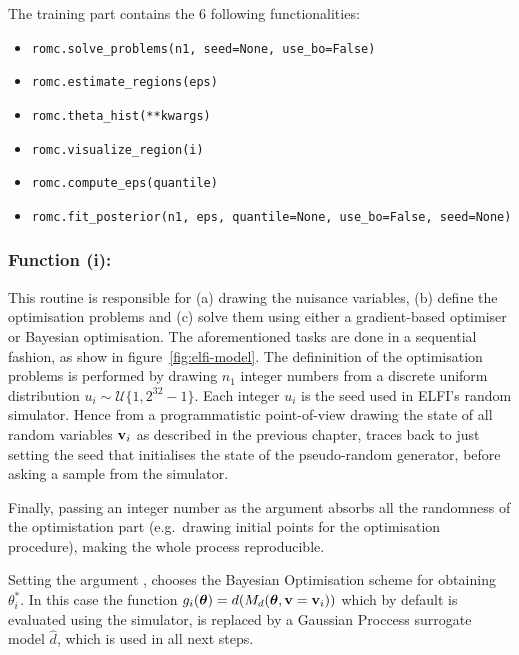 The training part contains the 6 following functionalities:

\begin{itemize}
\item \texttt{romc.solve_problems(n1, seed=None, use_bo=False)}
\item \texttt{romc.estimate_regions(eps)}
\item \texttt{romc.theta_hist(**kwargs)}
\item \texttt{romc.visualize_region(i)}
\item \texttt{romc.compute_eps(quantile)}
\item \texttt{romc.fit_posterior(n1, eps, quantile=None, use_bo=False, seed=None)}
\end{itemize}


\subsubsection*{Function (i): }

\noindent
This routine is responsible for (a) drawing the nuisance variables,
(b) define the optimisation problems and (c) solve them using either a
gradient-based optimiser or Bayesian optimisation. The aforementioned
tasks are done in a sequential fashion, as show in
figure~\ref{fig:elfi-model}. The defininition of the optimisation
problems is performed by drawing $n_1$ integer numbers from a discrete
uniform distribution $u_i \sim \mathcal{U}\{1, 2^{32}-1\}$. Each
integer $u_i$ is the seed used in ELFI's random simulator. Hence from
a programmatistic point-of-view drawing the state of all random
variables $\mathbf{v}_i$ as described in the previous chapter, traces back to
just setting the seed that initialises the state of the pseudo-random
generator, before asking a sample from the simulator.

Finally, passing an integer number as the argument 
absorbs all the randomness of the optimistation part (e.g.\ drawing
initial points for the optimisation procedure), making the whole
process reproducible.

Setting the argument , chooses the Bayesian
Optimisation scheme for obtaining $\theta_i^*$. In this case the
function $g_i(\boldsymbol{\theta}) = d(M_d(\boldsymbol{\theta},\mathbf{v}=\mathbf{v}_i))$ which by default
is evaluated using the simulator, is replaced by a Gaussian Proccess
surrogate model $\hat{d}$, which is used in all next steps.

